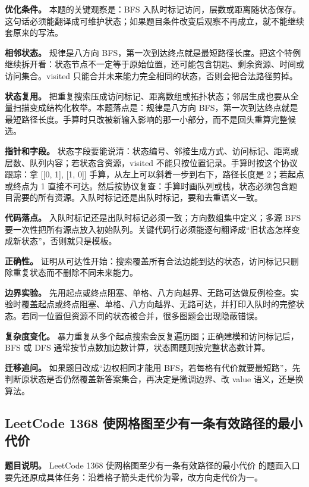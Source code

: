 \textbf{优化条件。} 本题的关键观察是：BFS 入队时标记访问，层数或距离随状态保存。这句话必须能翻译成可维护状态；如果题目条件改变后观察不再成立，就不能继续套原来的写法。

\textbf{相邻状态。} 规律是八方向 BFS，第一次到达终点就是最短路径长度。把这个特例继续拆开看：状态节点不一定等于原始位置，还可能包含钥匙、剩余资源、时间或访问集合。visited 只能合并未来能力完全相同的状态，否则会把合法路径剪掉。

\textbf{状态复用。} 把重复搜索压成访问标记、距离数组或拓扑状态；邻居生成也要从全量扫描变成结构化枚举。本题落点是：规律是八方向 BFS，第一次到达终点就是最短路径长度。手算时只改被新输入影响的那一小部分，而不是回头重算完整候选。

\textbf{指针和字段。} 状态字段要能说清：状态编号、邻接生成方式、访问标记、距离或层数、队列内容；若状态含资源，visited 不能只按位置记录。手算时按这个协议跟踪：拿 [[0, 1], [1, 0]] 手算，从左上可以斜着一步到右下，路径长度是 2；若起点或终点为 1 直接不可达。然后按协议复查：手算时画队列或栈，状态必须包含题目需要的所有资源。入队时标记还是出队时标记，要和去重语义一致。

\textbf{代码落点。} 入队时标记还是出队时标记必须一致；方向数组集中定义；多源 BFS 要一次性把所有源点放入初始队列。关键代码行必须能逐句翻译成“旧状态怎样变成新状态”，否则就只是模板。

\textbf{正确性。} 证明从可达性开始：搜索覆盖所有合法边能到达的状态，访问标记只删除重复状态而不删除不同未来能力。

\textbf{边界实验。} 先用起点或终点阻塞、单格、八方向越界、无路可达做反例检查。实验时覆盖起点或终点阻塞、单格、八方向越界、无路可达，并打印入队时的完整状态。若同一位置但资源不同的状态被合并，很多图题会出现隐蔽错误。

\textbf{复杂度变化。} 暴力重复从多个起点搜索会反复遍历图；正确建模和访问标记后，BFS 或 DFS 通常按节点数加边数计算，状态图题则按完整状态数计算。

\textbf{迁移追问。} 如果题目改成“边权相同才能用 BFS，若每格有代价就要最短路”，先判断原状态是否仍然覆盖新答案集合，再决定是微调边界、改 value 语义，还是换算法。

\subsection{LeetCode 1368 使网格图至少有一条有效路径的最小代价}

\textbf{题目说明。} LeetCode 1368 使网格图至少有一条有效路径的最小代价 的题面入口要先还原成具体任务：沿着格子箭头走代价为零，改方向走代价为一。


